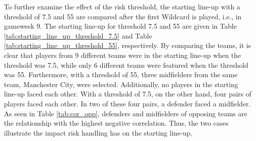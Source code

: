 To further examine the effect of the risk threshold, the starting line-up with a threshold of 7.5 and 55 are compared after the first Wildcard is played, i.e., in gameweek 9. The starting line-up for threshold 7.5 and 55 are given in Table \ref{tab:starting_line_up_threshold_7.5} and Table \ref{tab:starting_line_up_threshold_55}, respectively. By comparing the teams, it is clear that players from 9 different teams were in the starting line-up when the threshold was 7.5, while only 6 different teams were featured when the threshold was 55. Furthermore, with a threshold of 55, three midfielders from the same team, Manchester City, were selected. Additionally, no players in the starting line-up faced each other. With a threshold of 7.5, on the other hand,  four pairs of players faced each other. In two of these four pairs, a defender faced a midfielder. As seen in Table \ref{tab:cor_opp}, defenders and midfielders of opposing teams are the relationship with the highest negative correlation. Thus, the two cases illustrate the impact risk handling has on the starting line-up.


